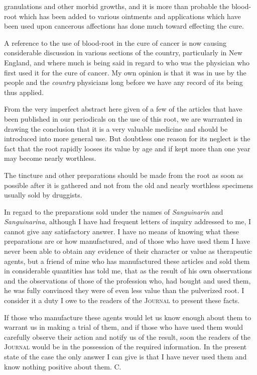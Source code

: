 granulations and other morbid growths, and it is more than probable
the blood-root which has been added to various ointments and
applications which have been used upon cancerous affections has done
much toward effecting the cure.

A reference to the use of blood-root in the cure of cancer is now
causing considerable discussion in various sections of the country, particularly
in New England, and where much is being said in regard to
who was the physician who first used it for the cure of cancer. My
own opinion is that it was in use by the people and the \emph{country} physicians
long before we have any record of its being thus applied.

From the very imperfect abstract here given of a few of the articles
that have been published in our periodicals on the use of this root, we are
warranted in drawing the conclusion that it is a very valuable medicine
and should be introduced into more general use. But doubtless one
reason for its neglect is the fact that the root rapidly looses its value by
age and if kept more than one year may become nearly worthless.

The tincture and other preparations should be made from the root as
soon as possible after it is gathered and not from the old and nearly
worthless specimens usually sold by druggists.

In regard to the preparations sold under the names of \emph{Sanguinarin}
and \emph{Sanguinarina}, although I have had frequent letters of inquiry
addressed to me, I cannot give any satisfactory answer. I have no
means of knowing what these preparations are or how manufactured,
and of those who have used them I have never been able to obtain any
evidence of their character or value as therapeutic agents, but a friend
of mine who has manufactured these articles and sold them in considerable
quantities has told me, that as the result of his own observations
and the observations of those of the profession who, had bought and
used them, he was fully convinced they were of even less value than
the pulverized root. I consider it a duty I owe to the readers of the
\textsc{Journal} to present these facts.

If those who manufacture these agents would let us know enough
about them to warrant us in making a trial of them, and if those who
have used them would carefully observe their action and notify us of
the result, soon the readers of the \textsc{Journal} would be in the possession
of the required information. In the present state of the case the only
answer I can give is that I have never used them and know nothing
positive about them. \hfill{}C.\quad\endinput
